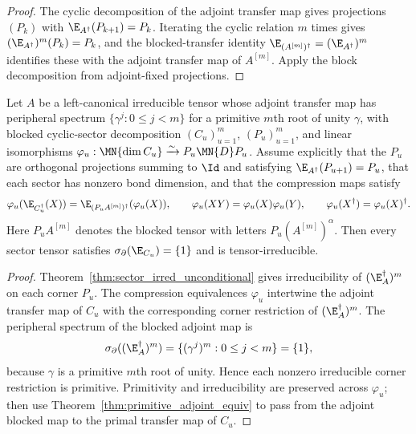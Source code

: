 \begin{proof}\leanok
    The cyclic decomposition of the adjoint transfer map gives projections
    $(P_k)$ with $\E_{A^\dagger}(P_{k+1}) = P_k$. Iterating the cyclic relation
    $m$ times gives $(\E_{A^\dagger})^m(P_k) = P_k$, and the blocked-transfer
    identity $\E_{(A^{[m]})^\dagger} = (\E_{A^\dagger})^m$ identifies these with
    the adjoint transfer map of $A^{[m]}$. Apply the block decomposition from
    adjoint-fixed projections.
\end{proof}

\begin{theorem}%
    \label{thm:blocked_sector_unconditional}
    \leanok
    Let $A$ be a left-canonical irreducible tensor whose adjoint transfer map has
    peripheral spectrum $\{\gamma^j : 0 \le j < m\}$ for a primitive $m$th root of
    unity $\gamma$, with blocked cyclic-sector decomposition $(C_u)_{u=1}^m$,
    $(P_u)_{u=1}^m$, and
    linear isomorphisms
    $\varphi_u : \MN{\dim C_u} \xrightarrow{\sim} P_u \MN{D} P_u$. Assume
    explicitly that the $P_u$ are orthogonal projections summing to $\Id$ and
    satisfying $\E_{A^\dagger}(P_{u+1})=P_u$, that each sector has nonzero bond
    dimension, and that the compression maps satisfy
    \[
        \varphi_u(\E_{C_u^\dagger}(X))
        =
        \E_{(P_uA^{[m]})^\dagger}(\varphi_u(X)),
        \qquad
        \varphi_u(XY)=\varphi_u(X)\varphi_u(Y),
        \qquad
        \varphi_u(X^\dagger)=\varphi_u(X)^\dagger.
    \]
    Here $P_uA^{[m]}$ denotes the blocked tensor with letters
    $P_u(A^{[m]})^\alpha$.
    Then every
    sector tensor satisfies $\sigma_\partial(\E_{C_u})=\{1\}$ and is
    tensor-irreducible.
\end{theorem}

\begin{proof}\leanok
    Theorem~\ref{thm:sector_irred_unconditional} gives irreducibility of
    $(\E_A^\dagger)^m$ on each corner $P_u$. The compression equivalences
    $\varphi_u$ intertwine the adjoint transfer map of $C_u$ with the
    corresponding corner restriction of $(\E_A^\dagger)^m$. The peripheral
    spectrum of the blocked adjoint map is
    \[
        \sigma_\partial((\E_A^\dagger)^m)
        =
        \{(\gamma^j)^m : 0 \le j < m\}
        =
        \{1\},
    \]
    because $\gamma$ is a primitive $m$th root of unity. Hence each nonzero
    irreducible corner restriction is primitive. Primitivity and irreducibility
    are preserved across $\varphi_u$; then use
    Theorem~\ref{thm:primitive_adjoint_equiv} to pass from the adjoint blocked
    map to the primal transfer map of $C_u$.
\end{proof}

